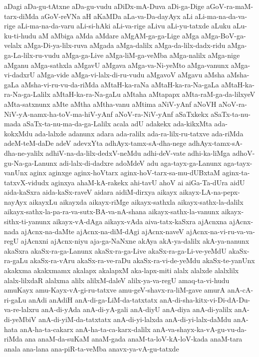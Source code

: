 {aDagi
aDa-gu-tAtxne
aDa-gu-vudu
aDiDx-mA-Duva
aDi-ga-Dige
aGoV-ra-maM-tarx-diMda
aGoV-reVNa
aH
aKaMDa
aLa-va-Da-dayAyx
aLi
aLi-ma-na-da-va-rige
aLi-ma-na-da-varu
aLi-si-hAki
aLi-va-rige
aLivu
aLi-yu-tatxde
aLuku
aLu-ku-ti-hudu
aM
aMbiga
aMda
aMdare
aMgAM-ga-ga-Lige
aMga
aMga-BoV-ga-velalx
aMga-Di-ya-lilx-ruva
aMgada
aMga-dalilx
aMga-da-lilx-dadx-ridu
aMga-ga-La-lilx-ru-vudu
aMga-ga-Live
aMga-liM-ga-veMba
aMga-nalilx
aMga-nige
aMganu
aMga-sathxla
aMgavU
aMgava
aMga-va-Ni-yeMto
aMga-vanunx
aMga-vi-dadxrU
aMga-vide
aMga-vi-lalx-di-ru-vudu
aMgavoV
aMgavu
aMsha
aMsha-gaLa
aMsha-vi-ru-vu-da-riMda
aMtaH-ka-raNa
aMtaH-ka-ra-Na-gaLa
aMtaH-ka-ra-Na-ga-Lalilx
aMtaH-ka-ra-Na-gaLu
aMtaha
aMtapapx
aMta-raM-ga-da-lilxyeV
aMta-satxnunx
aMte
aMtha
aMtha-vanu
aMtima
aNiV-yAnf
aNoVH
aNoV-ra-NiV-yA-namx-ha-toV-ma-hiV-yAnf
aNoV-ra-NiV-yAnf
aSaTxkekx
aSaTx-ta-nu-mada
aSaTx-ta-nu-ma-da-ga-Lalilx
acala
adU
adakekx
ada-kikxMta
ada-kokxMdu
ada-lalxde
adanunx
adara
ada-ralilx
ada-ra-lilx-ru-tatxve
ada-riMda
adeM-teM-daDe
adeV
adevxYta
adhAyx-tamx-sA-dha-nege
adhAyx-tamx-sA-dha-ne-yalilx
adhiV-na-da-lilx-dedxV-neMdu
adhi-deV-vate
adhi-ka-liMga
adhoV-gu-Na-ga-Lanunx
adi-lalx-di-dadxre
adoMdeV
adu
aga-tayx-ga-Lanunx
aga-tayx-vanUnx
aginx
aginxge
aginx-hoVtarx
aginx-hoV-tarx-sa-mu-dUBxtaM
aginx-ta-tatxvX-vidudx
aginxya
ahaM-kA-rakekx
ahi-tavU
ahoV
ai
aiGa-Ta-dUra
aidU
aida-kaSxra
aida-kaSx-raveV
aidara
aidiM-dirxya
aikayx
aikayx-LA-na-pepx-nayAyx
aikayxLu
aikayxda
aikayx-riMge
aikayx-sathxla
aikayx-sathx-la-dalilx
aikayx-sathx-la-pa-ra-va-sutx-BA-va-nA-shana
aikayx-sathx-la-vanunx
aikayx-sithx-ti-yanunx
aikayx-vA-dAga
aikayx-vAda
aiva-tatx-kaSxra
ajAcnxna
ajAcnx-nada
ajAcnx-na-daMte
ajAcnx-na-diM-dAgi
ajAcnx-naveV
ajAcnx-na-vi-ru-va-va-regU
ajAcnxni
ajAcnx-niyu
aja-ga-NaNxne
akAya
akA-ya-dalilx
akA-ya-nanunx
akaSxra
akaSx-ra-ga-Lanunx
akaSx-ra-ga-Live
akaSx-ra-ga-Li-ve-yeMdU
akaSx-ra-gaLu
akaSx-ra-vAru
akaSx-ra-ve-raDu
akaSx-ra-vi-de-yeMdu
akaSx-te-yanUnx
akakxma
akakxmamx
akalapx
akalapxM
aka-lapx-miti
alalx
alalxde
alalxlilx
alalx-lilxdaR
alalxma
alilx
alilxM-daleV
alilx-ya-va-regU
amaq-ta-vi-hudu
amuKayx
amu-Kayx-vA-gi-ru-tatxve
amu-geV-shavx-ra-liM-gave
amurA
anA-cA-ri-gaLu
anAdi
anAdiH
anA-di-ga-LiM-da-tatxtatx
anA-di-sha-kitx-vi-Di-dA-Du-va-re-lalxru
anA-di-yAda
anA-di-yA-gali
anA-diyU
anA-diya
anA-di-yalilx
anA-di-yeMbiV
anA-di-yiM-da-tatxtatx
anA-di-yi-lalxda
anA-di-yi-lalx-daMdu
anA-hata
anA-ha-ta-cakarx
anA-ha-ta-ca-karx-dalilx
anA-va-shayx-ka-vA-gu-vu-da-riMda
ana
anaM-da-suKaM
anaM-gada
anaM-ta-loV-kA-loV-kada
anaM-tara
anala
ana-lana
ana-piR-ta-veMba
anavx-ya-vA-gu-tatxde
}
